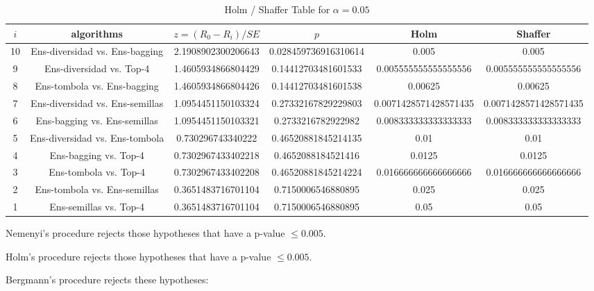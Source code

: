 \documentclass[a4paper,10pt]{article}
\begin{document}
\begin{landscape}
\begin{table}[!htp]
\centering\tiny
\caption{Holm / Shaffer Table for $\alpha=0.05$}
\begin{tabular}{cccccc}
$i$&algorithms&$z=(R_0 - R_i)/SE$&$p$&Holm&Shaffer\\
\hline
10&Ens-diversidad vs. Ens-bagging&2.1908902300206643&0.028459736916310614&0.005&0.005\\
9&Ens-diversidad vs. Top-4&1.4605934866804429&0.14412703481601533&0.005555555555555556&0.005555555555555556\\
8&Ens-tombola vs. Ens-bagging&1.4605934866804426&0.14412703481601538&0.00625&0.00625\\
7&Ens-diversidad vs. Ens-semillas&1.0954451150103324&0.27332167829229803&0.0071428571428571435&0.0071428571428571435\\
6&Ens-bagging vs. Ens-semillas&1.0954451150103321&0.2733216782922982&0.008333333333333333&0.008333333333333333\\
5&Ens-diversidad vs. Ens-tombola&0.730296743340222&0.46520881845214135&0.01&0.01\\
4&Ens-bagging vs. Top-4&0.7302967433402218&0.4652088184521416&0.0125&0.0125\\
3&Ens-tombola vs. Top-4&0.7302967433402208&0.46520881845214224&0.016666666666666666&0.016666666666666666\\
2&Ens-tombola vs. Ens-semillas&0.3651483716701104&0.7150006546880895&0.025&0.025\\
1&Ens-semillas vs. Top-4&0.3651483716701104&0.7150006546880895&0.05&0.05\\
\hline
\end{tabular}
\end{table}
Nemenyi's procedure rejects those hypotheses that have a p-value $\le0.005$.


Holm's procedure rejects those hypotheses that have a p-value $\le0.005$.


Bergmann's procedure rejects these hypotheses:


\begin{itemize}


\end{itemize}



\end{landscape}
\end{document}
